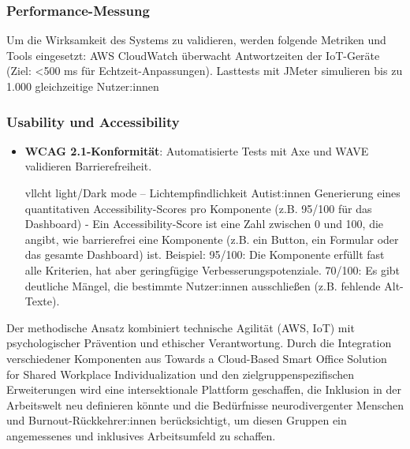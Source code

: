 \subsubsection{Performance-Messung}
Um die Wirksamkeit des Systems zu validieren, werden folgende Metriken und Tools eingesetzt:
AWS CloudWatch überwacht Antwortzeiten der IoT-Geräte (Ziel: <500 ms für Echtzeit-Anpassungen).
Lasttests mit JMeter simulieren bis zu 1.000 gleichzeitige Nutzer:innen


\subsubsection{Usability und Accessibility}
\begin{itemize}
    \item \textbf{WCAG 2.1-Konformität}: Automatisierte Tests mit Axe und WAVE validieren Barrierefreiheit.
  

vllcht light/Dark mode -- Lichtempfindlichkeit Autist:innen
Generierung eines quantitativen Accessibility-Scores pro Komponente (z.B. 95/100 für das Dashboard) - 
Ein Accessibility-Score ist eine Zahl zwischen 0 und 100, die angibt, wie barrierefrei eine Komponente
 (z.B. ein Button, ein Formular oder das gesamte Dashboard) ist.
 Beispiel:
 95/100: Die Komponente erfüllt fast alle Kriterien, hat aber geringfügige Verbesserungspotenziale.
  70/100: Es gibt deutliche Mängel, die bestimmte Nutzer:innen ausschließen (z.B. fehlende Alt-Texte).

\end{itemize}

Der methodische Ansatz kombiniert technische Agilität (AWS, IoT) mit psychologischer Prävention und ethischer Verantwortung. 
Durch die Integration verschiedener Komponenten aus \cite{ref01}{Towards a Cloud-Based Smart Office Solution for Shared Workplace 
Individualization} und den zielgruppenspezifischen Erweiterungen wird eine intersektionale Plattform geschaffen, die Inklusion 
in der Arbeitswelt neu definieren könnte und die Bedürfnisse neurodivergenter Menschen und Burnout-Rückkehrer:innen berücksichtigt,
um diesen Gruppen ein angemessenes und inklusives Arbeitsumfeld zu schaffen.

